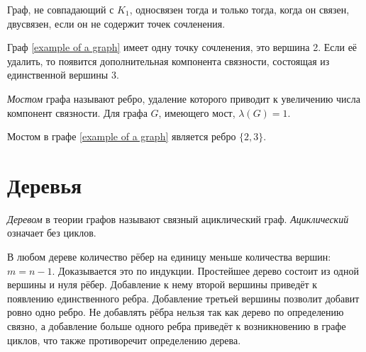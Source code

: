 Граф, не совпадающий с $K_1$, односвязен тогда и только тогда, когда он связен, 
двусвязен, если он не содержит точек сочленения.

Граф \ref{example of a graph} имеет одну точку сочленения, это вершина 2. Если её удалить, то появится дополнительная компонента связности, состоящая из единственной вершины 3.

\emph{Мостом} графа называют ребро, удаление которого приводит к увеличению 
числа компонент связности. Для графа $G$, имеющего мост, $\lambda(G)=1$.

Мостом в графе \ref{example of a graph} является ребро $\{2,3\}$.

\section{Деревья}

\emph{Деревом} в теории графов называют связный ациклический граф. 
\emph{Ациклический} означает без циклов.

В любом дереве количество рёбер на единицу меньше количества вершин: $m = n - 1$. Доказывается это по индукции. Простейшее дерево состоит из одной вершины и нуля рёбер. Добавление к нему второй вершины приведёт к появлению единственного ребра. Добавление третьей вершины позволит добавит ровно одно ребро. Не добавлять рёбра нельзя так как дерево по определению связно, а добавление больше одного ребра приведёт к возникновению в графе циклов, что также противоречит определению дерева.

